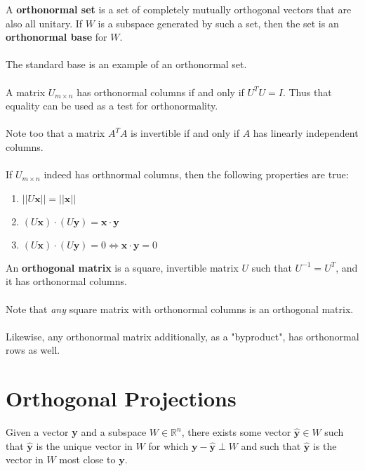 \documentclass[12pt]{article}
\newcommand{\R}{\mathbb{R}}
\newcommand{\bt}[1]{\textbf{{#1}}}
\newcommand{\bm}[1]{\mathbf{{#1}}}
\newcommand{\norm}[1]{||{#1}||}
\begin{document}
A \bt{orthonormal set} is a set of completely mutually orthogonal vectors that are also all unitary.
If $W$ is a subspace generated by such a set, then the set is an \bt{orthonormal base} for $W$. \\ \\

The standard base is an example of an orthonormal set. \\ \\

A matrix $U_{m \times n}$ has orthonormal columns if and only if $U^T U = I$. Thus that equality can be used as a test for orthonormality. \\ \\

Note too that a matrix $A^T A$ is invertible if and only if $A$ has linearly independent columns. \\ \\

If $U_{m \times n}$ indeed has orthnormal columns, then the following properties are true:

\begin{enumerate}
    \item $\norm{U\bm{x}} = \norm{\bm{x}}$
    \item $(U\bm{x})\cdot(U\bm{y}) = \bm{x \cdot y}$
    \item $(U\bm{x})\cdot(U\bm{y}) = 0 \iff \bm{x \cdot y} = 0$
\end{enumerate}

An \bt{orthogonal matrix} is a square, invertible matrix $U$ such that $U^{-1} = U^T$,
and it has orthonormal columns. \\ \\

Note that \emph{any} square matrix with orthonormal columns is an orthogonal matrix. \\ \\

Likewise, any orthonormal matrix additionally, as a "byproduct", has orthonormal rows as well.

\section*{Orthogonal Projections}

Given a vector \bt{y} and a subspace $W \in \R^n$, there exists some
vector $\bm{\hat{y}} \in W$ such that $\bm{\hat{y}}$ is the unique vector in $W$
for which $\bm{y - \hat{y}}\perp W$ and such that $\bm{\hat{y}}$ is the vector in $W$
most close to $\bm{y}$. \\ \\
\end{document}
